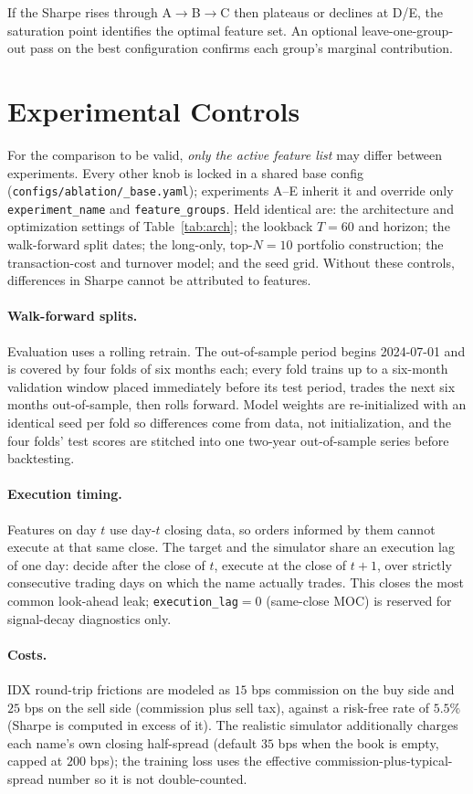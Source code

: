 \documentclass[10pt,twocolumn]{article}
\begin{document}
If the Sharpe rises through A$\to$B$\to$C then plateaus or declines at
D/E, the saturation point identifies the optimal feature set. An
optional leave-one-group-out pass on the best configuration confirms
each group's marginal contribution.

\section{Experimental Controls}
For the comparison to be valid, \emph{only the active feature list} may
differ between experiments. Every other knob is locked in a shared base
config (\texttt{configs/ablation/\_base.yaml}); experiments A--E inherit
it and override only \texttt{experiment\_name} and
\texttt{feature\_groups}. Held identical are: the architecture and
optimization settings of Table~\ref{tab:arch}; the lookback $T{=}60$ and
horizon; the walk-forward split dates; the long-only, top-$N{=}10$
portfolio construction; the transaction-cost and turnover model; and the
seed grid. Without these controls, differences in Sharpe cannot be
attributed to features.

\paragraph{Walk-forward splits.} Evaluation uses a rolling retrain. The
out-of-sample period begins 2024-07-01 and is covered by four folds of
six months each; every fold trains up to a six-month validation window
placed immediately before its test period, trades the next six months
out-of-sample, then rolls forward. Model weights are re-initialized with
an identical seed per fold so differences come from data, not
initialization, and the four folds' test scores are stitched into one
two-year out-of-sample series before backtesting.

\paragraph{Execution timing.} Features on day $t$ use day-$t$ closing
data, so orders informed by them cannot execute at that same close. The
target and the simulator share an execution lag of one day: decide after
the close of $t$, execute at the close of $t{+}1$, over strictly
consecutive trading days on which the name actually trades. This closes
the most common look-ahead leak; \texttt{execution\_lag}${=}0$ (same-close
MOC) is reserved for signal-decay diagnostics only.

\paragraph{Costs.} IDX round-trip frictions are modeled as $15$ bps
commission on the buy side and $25$ bps on the sell side (commission plus
sell tax), against a risk-free rate of $5.5\%$ (Sharpe is computed in
excess of it). The realistic simulator additionally charges each name's
own closing half-spread (default $35$ bps when the book is empty, capped
at $200$ bps); the training loss uses the effective commission-plus-typical-spread
number so it is not double-counted.
\end{document}

